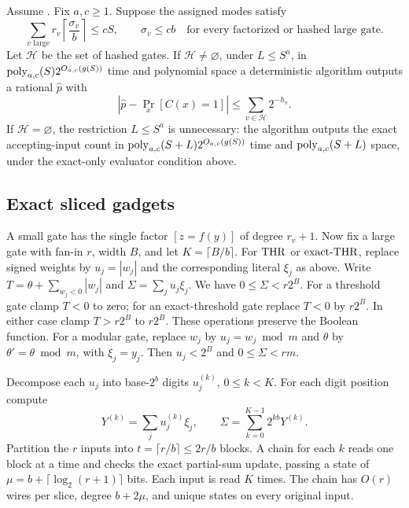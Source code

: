 \begin{theorem}
\label{thm:unified}
Assume \HTC. Fix $a,c\ge1$. Suppose the assigned modes satisfy
\begin{equation}\label{eq:budget}
 \sum_{v\text{ large}}r_v\left\lceil\frac{\sigma_v}{b}\right\rceil
 \le cS,
 \qquad \sigma_v\le cb
 \quad\text{for every factorized or hashed large gate}.
\end{equation}
Let $\mathcal H$ be the set of hashed gates. If
$\mathcal H\ne\varnothing$, under $L\le S^a$, in
$\operatorname{poly}_{a,c}(S)2^{O_{a,c}(g(S))}$ time and polynomial space a
deterministic algorithm outputs a rational $\widehat p$ with
\[
 \left|\widehat p-\Pr_x[C(x)=1]\right|
 \le\sum_{v\in\mathcal H}2^{-h_v}.
\]
If $\mathcal H=\varnothing$, the restriction $L\le S^a$ is unnecessary:
the algorithm outputs the exact accepting-input count in
$\operatorname{poly}_{a,c}(S+L)2^{O_{a,c}(g(S))}$ time and
$\operatorname{poly}_{a,c}(S+L)$ space, under the exact-only evaluator condition above.
\end{theorem}

\subsection{Exact sliced gadgets}

A small gate has the single factor $[z=f(y)]$ of degree $r_v+1$.
Now fix a large gate with fan-in $r$, width $B$, and let
$K=\lceil B/b\rceil$. For $\mathrm{THR}$ or $\mathrm{exact\text{-}THR}$, replace signed weights
by $u_j=|w_j|$ and the corresponding literal $\xi_j$ as above. Write
$T=\theta+\sum_{w_j<0}|w_j|$ and
$\Sigma=\sum_ju_j\xi_j$. We have
$0\le\Sigma<r2^B$. For a threshold gate clamp $T<0$ to zero; for an
exact-threshold gate replace $T<0$ by $r2^B$. In either case clamp
$T>r2^B$ to $r2^B$. These operations preserve the Boolean function.
For a modular gate, replace $w_j$ by $u_j=w_j\bmod m$ and $\theta$
by $\theta'=\theta\bmod m$, with $\xi_j=y_j$. Then $u_j<2^B$ and
$0\le\Sigma<rm$.

Decompose each $u_j$ into base-$2^b$ digits $u_j^{(k)}$, $0\le k<K$.
For each digit position compute
\[
 Y^{(k)}=\sum_ju_j^{(k)}\xi_j,\qquad
 \Sigma=\sum_{k=0}^{K-1}2^{kb}Y^{(k)}.
\]
Partition the $r$ inputs into $t=\lceil r/b\rceil\le2r/b$ blocks.
A chain for each $k$ reads one block at a time and checks the exact
partial-sum update, passing a state of
$\mu=b+\lceil\log_2(r+1)\rceil$ bits. Each input is read $K$ times.
The chain has $O(r)$ wires per slice, degree $b+2\mu$, and unique
states on every original input.

